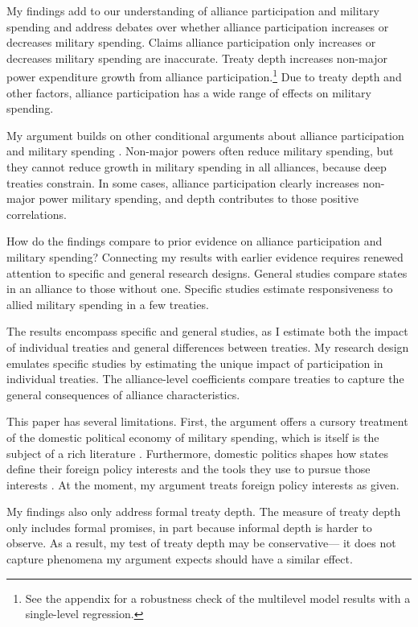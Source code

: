 \documentclass[12pt]{article}
\begin{document}
My findings add to our understanding of alliance participation and military spending and address debates over whether alliance participation increases or decreases military spending. 
Claims alliance participation only increases or decreases military spending are inaccurate. 
Treaty depth increases non-major power expenditure growth from alliance participation.\footnote{See the appendix for a robustness check of the multilevel model results with a single-level regression.}
Due to treaty depth and other factors, alliance participation has a wide range of effects on military spending. 


My argument builds on other conditional arguments about alliance participation and military spending \citep{DigiuseppePoast2016}. 
Non-major powers often reduce military spending, but they cannot reduce growth in military spending in all alliances, because deep treaties constrain.
In some cases, alliance participation clearly increases non-major power military spending, and depth contributes to those positive correlations. 


How do the findings compare to prior evidence on alliance participation and military spending? 
Connecting my results with earlier evidence requires renewed attention to specific and general research designs. 
General studies compare states in an alliance to those without one. 
Specific studies estimate responsiveness to allied military spending in a few treaties. 


The results encompass specific and general studies, as I estimate both the impact of individual treaties and general differences between treaties. 
My research design emulates specific studies by estimating the unique impact of participation in individual treaties. 
The alliance-level coefficients compare treaties to capture the general consequences of alliance characteristics. 


This paper has several limitations.
First, the argument offers a cursory treatment of the domestic political economy of military spending, which is itself is the subject of a rich literature \citep{WhittenWilliams2011, AlptekinLevine2012}.  
Furthermore, domestic politics shapes how states define their foreign policy interests and the tools they use to pursue those interests \citep{Fordham1998, Fordham2011, Narizny2007}. 
At the moment, my argument treats foreign policy interests as given.  


My findings also only address formal treaty depth. 
The measure of treaty depth only includes formal promises, in part because informal depth is harder to observe. 
As a result, my test of treaty depth may be conservative--- it does not capture phenomena my argument expects should have a similar effect. 
\end{document}
